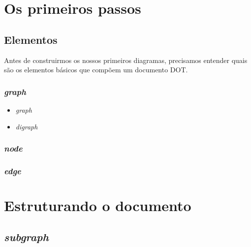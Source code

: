 \documentclass[a4paper,12pt]{article}
\begin{document}
    \break

  \section{Os primeiros passos}

    \subsection{Elementos}
      Antes de construirmos os nossos primeiros diagramas,
      precisamos entender quais são os elementos básicos
      que compõem um documento DOT.

      \subsubsection{\emph{graph}}

        \begin{itemize}

          \item{\emph{graph}}

          \item{\emph{digraph}}

        \end{itemize}

      \subsubsection{\emph{node}}

      \subsubsection{\emph{edge}}


  \section{Estruturando o documento}

    \subsection{\emph{subgraph}}
\end{document}
